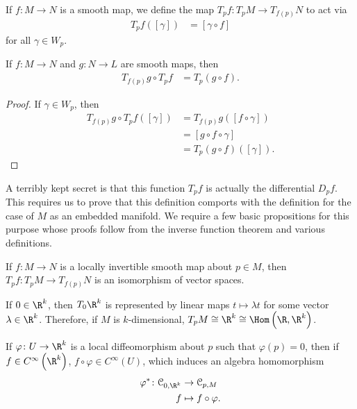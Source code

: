 \documentclass[10pt]{mypackage}
\begin{document}
\begin{definition}
  If $f\colon M\rightarrow N$ is a smooth map, we define the map $T_pf\colon T_pM\rightarrow T_{f(p)}N$ to act via
  \begin{align*}
    T_pf\left( \left[ \gamma \right] \right) &= \left[ \gamma\circ f \right]
  \end{align*}
  for all $\gamma\in W_{p}$.
\end{definition}
\begin{proposition}
  If $f\colon M\rightarrow N$ and $g\colon N\rightarrow L$ are smooth maps, then
  \begin{align*}
    T_{f(p)}g\circ T_pf &= T_{p}\left( g\circ f \right).
  \end{align*}
\end{proposition}
\begin{proof}
  If $\gamma\in W_{p}$, then
  \begin{align*}
    T_{f(p)}g\circ T_{p}f\left( \left[ \gamma \right] \right) &= T_{f(p)}g\left( \left[ f\circ \gamma \right] \right)\\
                                                              &= \left[ g\circ f \circ \gamma \right]\\
                                                              &= T_{p}\left( g\circ f \right)\left( \left[ \gamma \right] \right).
  \end{align*}
\end{proof}
A terribly kept secret is that this function $T_pf$ is actually the differential $D_pf$. This requires us to prove that this definition comports with the definition for the case of $M$ as an embedded manifold. We require a few basic propositions for this purpose whose proofs follow from the inverse function theorem and various definitions.
\begin{proposition}
  If $f\colon M\rightarrow N$ is a locally invertible smooth map about $p\in M$, then $T_{p}f\colon T_pM\rightarrow T_{f(p)}N$ is an isomorphism of vector spaces.
\end{proposition}
\begin{proposition}
  If $0\in \R^{k}$, then $T_0\R^{k}$ is represented by linear maps $t\mapsto \lambda t$ for some vector $\lambda\in \R^{k}$. Therefore, if $M$ is $k$-dimensional, $T_pM\cong \R^{k}\cong \Hom\left( \R,\R^{k} \right)$.
\end{proposition}
\begin{proposition}
  If $\varphi\colon U\rightarrow \R^{k}$ is a local diffeomorphism about $p$ such that $\varphi(p) = 0$, then if $f\in C^{\infty}\left( \R^{k} \right)$, $f\circ\varphi\in C^{\infty}\left( U \right)$, which induces an algebra homomorphism 
  \begin{align*}
    \varphi^{\ast}\colon \mathcal{C}_{0,\R^{k}}&\rightarrow \mathcal{C}_{p,M}\\
    f &\mapsto f\circ\varphi.
  \end{align*}
\end{proposition}
\end{document}

